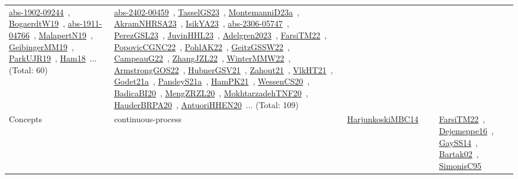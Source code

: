 {\begin{longtable}{lp{3cm}>{\raggedright\arraybackslash}p{6cm}>{\raggedright\arraybackslash}p{6cm}>{\raggedright\arraybackslash}p{8cm}}
\href{works/abs-1902-09244.pdf}{abs-1902-09244}~\cite{abs-1902-09244}, \href{works/BogaerdtW19.pdf}{BogaerdtW19}~\cite{BogaerdtW19}, \href{works/abs-1911-04766.pdf}{abs-1911-04766}~\cite{abs-1911-04766}, \href{works/MalapertN19.pdf}{MalapertN19}~\cite{MalapertN19}, \href{works/GeibingerMM19.pdf}{GeibingerMM19}~\cite{GeibingerMM19}, \href{works/ParkUJR19.pdf}{ParkUJR19}~\cite{ParkUJR19}, \href{works/Ham18.pdf}{Ham18}~\cite{Ham18}... (Total: 60) & \href{works/abs-2402-00459.pdf}{abs-2402-00459}~\cite{abs-2402-00459}, \href{works/TasselGS23.pdf}{TasselGS23}~\cite{TasselGS23}, \href{works/MontemanniD23a.pdf}{MontemanniD23a}~\cite{MontemanniD23a}, \href{works/AkramNHRSA23.pdf}{AkramNHRSA23}~\cite{AkramNHRSA23}, \href{works/IsikYA23.pdf}{IsikYA23}~\cite{IsikYA23}, \href{works/abs-2306-05747.pdf}{abs-2306-05747}~\cite{abs-2306-05747}, \href{works/PerezGSL23.pdf}{PerezGSL23}~\cite{PerezGSL23}, \href{works/JuvinHHL23.pdf}{JuvinHHL23}~\cite{JuvinHHL23}, \href{works/Adelgren2023.pdf}{Adelgren2023}~\cite{Adelgren2023}, \href{works/FarsiTM22.pdf}{FarsiTM22}~\cite{FarsiTM22}, \href{works/PopovicCGNC22.pdf}{PopovicCGNC22}~\cite{PopovicCGNC22}, \href{works/PohlAK22.pdf}{PohlAK22}~\cite{PohlAK22}, \href{works/GeitzGSSW22.pdf}{GeitzGSSW22}~\cite{GeitzGSSW22}, \href{works/CampeauG22.pdf}{CampeauG22}~\cite{CampeauG22}, \href{works/ZhangJZL22.pdf}{ZhangJZL22}~\cite{ZhangJZL22}, \href{works/WinterMMW22.pdf}{WinterMMW22}~\cite{WinterMMW22}, \href{works/ArmstrongGOS22.pdf}{ArmstrongGOS22}~\cite{ArmstrongGOS22}, \href{works/HubnerGSV21.pdf}{HubnerGSV21}~\cite{HubnerGSV21}, \href{works/Zahout21.pdf}{Zahout21}~\cite{Zahout21}, \href{works/VlkHT21.pdf}{VlkHT21}~\cite{VlkHT21}, \href{works/Godet21a.pdf}{Godet21a}~\cite{Godet21a}, \href{works/PandeyS21a.pdf}{PandeyS21a}~\cite{PandeyS21a}, \href{works/HamPK21.pdf}{HamPK21}~\cite{HamPK21}, \href{works/WessenCS20.pdf}{WessenCS20}~\cite{WessenCS20}, \href{works/BadicaBI20.pdf}{BadicaBI20}~\cite{BadicaBI20}, \href{works/MengZRZL20.pdf}{MengZRZL20}~\cite{MengZRZL20}, \href{works/MokhtarzadehTNF20.pdf}{MokhtarzadehTNF20}~\cite{MokhtarzadehTNF20}, \href{works/HauderBRPA20.pdf}{HauderBRPA20}~\cite{HauderBRPA20}, \href{works/AntuoriHHEN20.pdf}{AntuoriHHEN20}~\cite{AntuoriHHEN20}... (Total: 109)\\
Concepts & continuous-process & \href{works/HarjunkoskiMBC14.pdf}{HarjunkoskiMBC14}~\cite{HarjunkoskiMBC14} &  & \href{works/FarsiTM22.pdf}{FarsiTM22}~\cite{FarsiTM22}, \href{works/Dejemeppe16.pdf}{Dejemeppe16}~\cite{Dejemeppe16}, \href{works/GaySS14.pdf}{GaySS14}~\cite{GaySS14}, \href{works/Bartak02.pdf}{Bartak02}~\cite{Bartak02}, \href{works/SimonisC95.pdf}{SimonisC95}~\cite{SimonisC95}\\

\end{longtable}}

